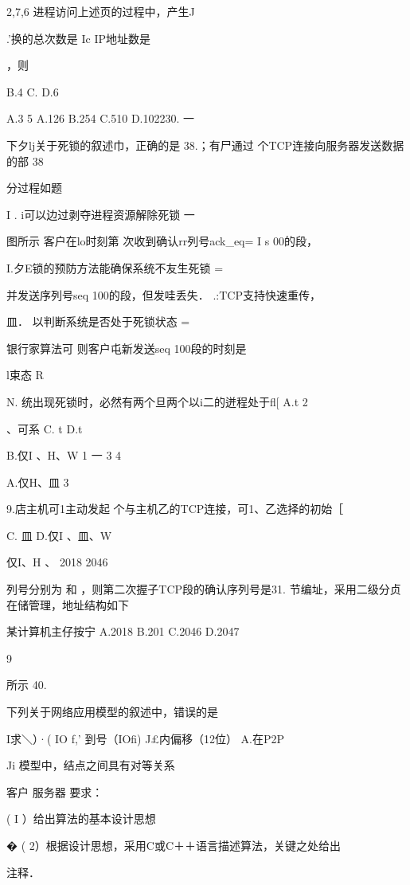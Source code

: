    2,7,6   进程访问上述页的过程中，产生J{.'换的总次数是    Ic IP地址数是

    ，则

    B.4    C.    D.6

    A.3    5    A.126    B.254    C.510    D.102230.    一

   下夕lj关于死锁的叙述巾，正确的是    38.；有尸通过  个TCP连接向服务器发送数据的部    38

    分过程如题

    I . i可以边过剥夺进程资源解除死锁    一

    图所示  客户在lo时刻第  次收到确认rr列号ack_eq= I s    00的段，

    I.夕E锁的预防方法能确保系统不友生死锁    =

    并发送序列号seq  100的段，但发哇丢失． .:TCP支持快速重传，

   皿．    以判断系统是否处于死锁状态    =

    银行家算法可    则客户屯新发送seq 100段的时刻是

    l束态    R

    N.    统出现死锁时，必然有两个旦两个以i二的迸程处于fl[    A.t    2

    、可系    C. t    D.t

    B.仅I 、H、W    1     一    3     4

    A.仅H、皿    3

    9.店主机可1主动发起  个与主机乙的TCP连接，可1、乙选择的初始［

   C.    皿    D.仅I 、皿、W

    仅I、H 、    2018   2046

    列号分别为    和    ，则第二次握子TCP段的确认序列号是31.    节编址，采用二级分贞在储管理，地址结构如下

   某计算机主仔按宁    A.2018    B.201    C.2046    D.2047

    9

   所示    40.

    下列关于网络应用模型的叙述中，错误的是

    I求＼）·( IO f,'     到号（IOfi)    J£内偏移（12位）    A.在P2P

    Ji    模型中，结点之间具有对等关系

    客户    服务器    要求：

    ( I ）给出算法的基本设计思想

    �    ( 2）根据设计思想，采用C或C＋＋语言描述算法，关键之处给出

    注释．

}
